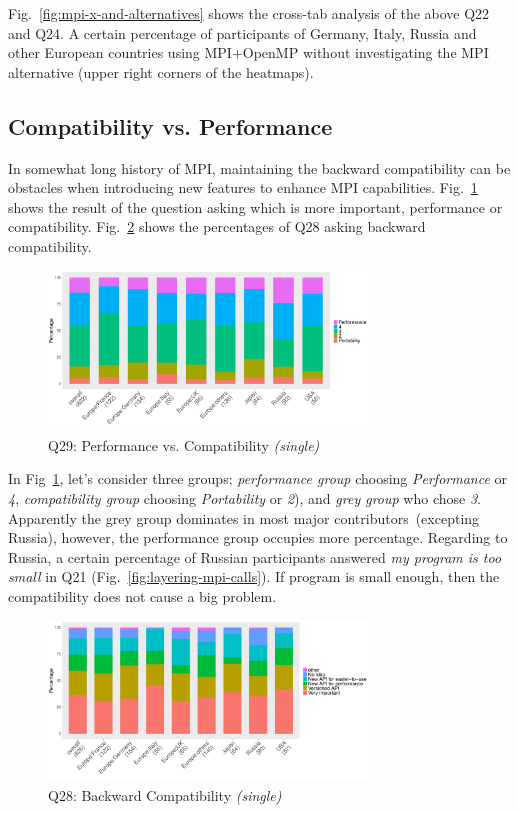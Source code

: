 \documentclass[preprint,5p,times]{elsarticle}
\def\myquote#1{{\it #1}}
\def\mcountries{major contributors\xspace{}}%
\begin{document}
Fig.~\ref{fig:mpi-x-and-alternatives} shows the cross-tab analysis of
the above Q22 and Q24. A certain percentage of participants of
Germany, Italy, Russia and other European countries using MPI+OpenMP
without investigating the MPI alternative (upper right corners of the
heatmaps).

\subsection{Compatibility vs. Performance}

In somewhat long history of MPI, maintaining the backward
compatibility can be obstacles when introducing new features to
enhance MPI capabilities. Fig.~\ref{fig:performance-vs-compatibility}
shows the result of the question asking which is more important,
performance or compatibility. Fig.~\ref{fig:compatibility} shows the
percentages of Q28 asking backward compatibility.

\begin{figure}[htb]
\begin{center}
\includegraphics[width=8.5cm]{R-scripts/Q29.pdf}
\caption{Q29: Performance vs. Compatibility {\it(single)}}
\label{fig:performance-vs-compatibility}
\end{center}
\end{figure}

In Fig~\ref{fig:performance-vs-compatibility}, let's consider three
groups; {\it performance group} choosing \myquote{Performance} or
\myquote{4}, {\it compatibility group} choosing \myquote{Portability} or
\myquote{2}), and {\it grey group} who chose \myquote{3}. Apparently the grey
group dominates in most \mcountries\  (excepting Russia),
however, the performance group occupies more percentage. Regarding to
Russia, a certain percentage of Russian participants answered
\myquote{my program is too small} in Q21
(Fig.~\ref{fig:layering-mpi-calls}). If program is small enough, then
the compatibility does not cause a big problem.

\begin{figure}[htb]
\begin{center}
\includegraphics[width=8.5cm]{R-scripts/Q28.pdf}
\caption{Q28: Backward Compatibility {\it(single)}}
\label{fig:compatibility}
\end{center}
\end{figure}
\end{document}

